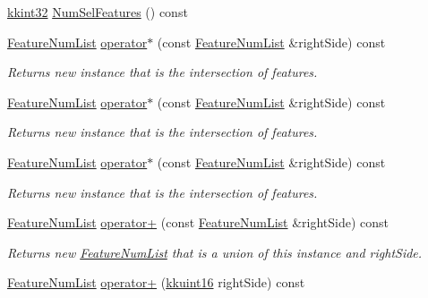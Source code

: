 \begin{DoxyCompactItemize}
\item 
\hyperlink{namespace_k_k_b_a8fa4952cc84fda1de4bec1fbdd8d5b1b}{kkint32} \hyperlink{class_k_k_m_l_l_1_1_feature_num_list_a1c1a2cb406970e8841e67cbc89c4871c}{Num\+Sel\+Features} () const 
\item 
\hyperlink{class_k_k_m_l_l_1_1_feature_num_list}{Feature\+Num\+List} \hyperlink{class_k_k_m_l_l_1_1_feature_num_list_a990b73406964dfb6ea86400365c78c65}{operator$\ast$} (const \hyperlink{class_k_k_m_l_l_1_1_feature_num_list}{Feature\+Num\+List} \&right\+Side) const 
\begin{DoxyCompactList}\small\item\em Returns new instance that is the intersection of features. \end{DoxyCompactList}\item 
\hyperlink{class_k_k_m_l_l_1_1_feature_num_list}{Feature\+Num\+List} \hyperlink{class_k_k_m_l_l_1_1_feature_num_list_aaceac02ad5745998c9a60dc8bd0befa2}{operator$\ast$} (const \hyperlink{class_k_k_m_l_l_1_1_feature_num_list}{Feature\+Num\+List} \&right\+Side) const 
\begin{DoxyCompactList}\small\item\em Returns new instance that is the intersection of features. \end{DoxyCompactList}\item 
\hyperlink{class_k_k_m_l_l_1_1_feature_num_list}{Feature\+Num\+List} \hyperlink{class_k_k_m_l_l_1_1_feature_num_list_aaceac02ad5745998c9a60dc8bd0befa2}{operator$\ast$} (const \hyperlink{class_k_k_m_l_l_1_1_feature_num_list}{Feature\+Num\+List} \&right\+Side) const 
\begin{DoxyCompactList}\small\item\em Returns new instance that is the intersection of features. \end{DoxyCompactList}\item 
\hyperlink{class_k_k_m_l_l_1_1_feature_num_list}{Feature\+Num\+List} \hyperlink{class_k_k_m_l_l_1_1_feature_num_list_a318a36dcaa6641b3a621ae2071d57e74}{operator+} (const \hyperlink{class_k_k_m_l_l_1_1_feature_num_list}{Feature\+Num\+List} \&right\+Side) const 
\begin{DoxyCompactList}\small\item\em Returns new \hyperlink{class_k_k_m_l_l_1_1_feature_num_list}{Feature\+Num\+List} that is a union of this instance and \textquotesingle{}right\+Side\textquotesingle{}. \end{DoxyCompactList}\item 
\hyperlink{class_k_k_m_l_l_1_1_feature_num_list}{Feature\+Num\+List} \hyperlink{class_k_k_m_l_l_1_1_feature_num_list_af01c47126291cbd72fa22a688fb84e14}{operator+} (\hyperlink{namespace_k_k_b_aa8c7d4d30381c8a0b6fce68974a9c8a9}{kkuint16} right\+Side) const 

\end{DoxyCompactItemize}
